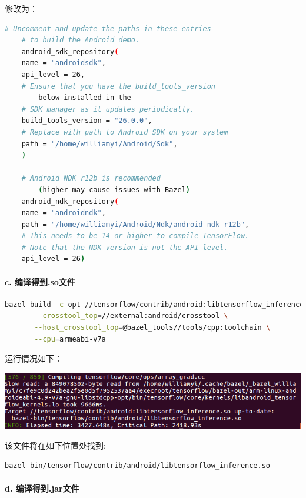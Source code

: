 \documentclass[UTF8, Microsoft YaHei]{book}
\begin{document}
    修改为：

    \begin{lstlisting}[language=bash]
    # Uncomment and update the paths in these entries
    # to build the Android demo.
    android_sdk_repository(
    name = "androidsdk",
    api_level = 26,
    # Ensure that you have the build_tools_version
        below installed in the
    # SDK manager as it updates periodically.
    build_tools_version = "26.0.0",
    # Replace with path to Android SDK on your system
    path = "/home/williamyi/Android/Sdk",
    )

    # Android NDK r12b is recommended
        (higher may cause issues with Bazel)
    android_ndk_repository(
    name = "androidndk",
    path = "/home/williamyi/Android/Ndk/android-ndk-r12b",
    # This needs to be 14 or higher to compile TensorFlow.
    # Note that the NDK version is not the API level.
    api_level = 26)
    \end{lstlisting}

    \paragraph{c. 编译得到.so文件}

    \begin{lstlisting}[language=bash]
    bazel build -c opt //tensorflow/contrib/android:libtensorflow_inference.so \
       --crosstool_top=//external:android/crosstool \
       --host_crosstool_top=@bazel_tools//tools/cpp:toolchain \
       --cpu=armeabi-v7a
    \end{lstlisting}

    运行情况如下：

    \includegraphics[width=1.0\textwidth]{img/TensorFlow编译.png}

    该文件将在如下位置处找到:

    \begin{lstlisting}[language=bash]
    bazel-bin/tensorflow/contrib/android/libtensorflow_inference.so
    \end{lstlisting}

    \paragraph{d. 编译得到.jar文件}
\end{document}
